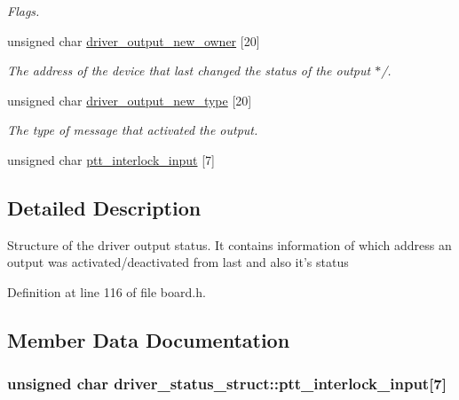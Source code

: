 \begin{CompactItemize}
\begin{CompactList}\small\item\em Flags. \item\end{CompactList}\item 
\hypertarget{structdriver__status__struct_eb02989e2348ebf41624434df28a9fac}{
unsigned char \hyperlink{structdriver__status__struct_eb02989e2348ebf41624434df28a9fac}{driver\_\-output\_\-new\_\-owner} \mbox{[}20\mbox{]}}
\label{structdriver__status__struct_eb02989e2348ebf41624434df28a9fac}

\begin{CompactList}\small\item\em The address of the device that last changed the status of the output $\ast$/. \item\end{CompactList}\item 
\hypertarget{structdriver__status__struct_81b6e319e8c2ba627778d9d53abf0003}{
unsigned char \hyperlink{structdriver__status__struct_81b6e319e8c2ba627778d9d53abf0003}{driver\_\-output\_\-new\_\-type} \mbox{[}20\mbox{]}}
\label{structdriver__status__struct_81b6e319e8c2ba627778d9d53abf0003}

\begin{CompactList}\small\item\em The type of message that activated the output. \item\end{CompactList}\item 
unsigned char \hyperlink{structdriver__status__struct_45e2a5e354755c1dddd3bbe3be07d758}{ptt\_\-interlock\_\-input} \mbox{[}7\mbox{]}
\end{CompactItemize}


\subsection{Detailed Description}
Structure of the driver output status. It contains information of which address an output was activated/deactivated from last and also it's status 

Definition at line 116 of file board.h.

\subsection{Member Data Documentation}
\hypertarget{structdriver__status__struct_45e2a5e354755c1dddd3bbe3be07d758}{
\subsubsection[{ptt\_\-interlock\_\-input}]{\setlength{\rightskip}{0pt plus 5cm}unsigned char {\bf driver\_\-status\_\-struct::ptt\_\-interlock\_\-input}\mbox{[}7\mbox{]}}}
\label{structdriver__status__struct_45e2a5e354755c1dddd3bbe3be07d758}


